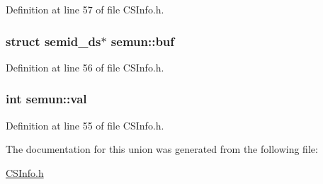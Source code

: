 Definition at line 57 of file CSInfo.h.\hypertarget{unionsemun_ac6b6428d07d4147fd2cc698b53555bed}{
\subsubsection[{buf}]{\setlength{\rightskip}{0pt plus 5cm}struct semid\_\-ds$\ast$ {\bf semun::buf}}}
\label{unionsemun_ac6b6428d07d4147fd2cc698b53555bed}


Definition at line 56 of file CSInfo.h.\hypertarget{unionsemun_ac6121ecb6d04a024e07e12bd71b94031}{
\subsubsection[{val}]{\setlength{\rightskip}{0pt plus 5cm}int {\bf semun::val}}}
\label{unionsemun_ac6121ecb6d04a024e07e12bd71b94031}


Definition at line 55 of file CSInfo.h.

The documentation for this union was generated from the following file:\begin{DoxyCompactItemize}
\item 
\hyperlink{CSInfo_8h}{CSInfo.h}\end{DoxyCompactItemize}
